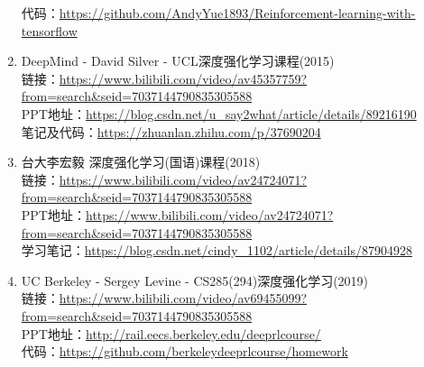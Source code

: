 \documentclass[lang=cn,11pt,a4paper]{eleganttemplate}
\begin{document}
\begin{enumerate}
    代码：\href{https://github.com/AndyYue1893/Reinforcement-learning-with-tensorflow}{https://github.com/AndyYue1893/Reinforcement-learning-with-tensorflow}  
    \item DeepMind - David Silver - UCL深度强化学习课程(2015) \\
    链接：\href{https://www.bilibili.com/video/av45357759?from=search&seid=7037144790835305588}{https://www.bilibili.com/video/av45357759?from=search\&seid=7037144790835305588}  \\
    PPT地址：\href{https://blog.csdn.net/u_say2what/article/details/89216190}{https://blog.csdn.net/u\_say2what/article/details/89216190} \\
    笔记及代码：\href{https://zhuanlan.zhihu.com/p/37690204}{https://zhuanlan.zhihu.com/p/37690204} 
    \item 台大李宏毅 深度强化学习(国语)课程(2018) \\
    链接：\href{https://www.bilibili.com/video/av24724071?from=search&seid=7037144790835305588}{https://www.bilibili.com/video/av24724071?from=search\&seid=7037144790835305588}  \\
    PPT地址：\href{https://www.bilibili.com/video/av24724071?from=search&seid=7037144790835305588}{https://www.bilibili.com/video/av24724071?from=search\&seid=7037144790835305588}  \\
    学习笔记：\href{https://blog.csdn.net/cindy_1102/article/details/87904928}{https://blog.csdn.net/cindy\_1102/article/details/87904928} 
    \item UC Berkeley - Sergey Levine - CS285(294)深度强化学习(2019) \\
    链接：\href{https://www.bilibili.com/video/av69455099?from=search&seid=7037144790835305588}{https://www.bilibili.com/video/av69455099?from=search\&seid=7037144790835305588}  \\
    PPT地址：\href{http://rail.eecs.berkeley.edu/deeprlcourse/}{http://rail.eecs.berkeley.edu/deeprlcourse/}  \\
    代码：\href{https://github.com/berkeleydeeprlcourse/homework}{https://github.com/berkeleydeeprlcourse/homework}
\end{enumerate}
\end{document}
